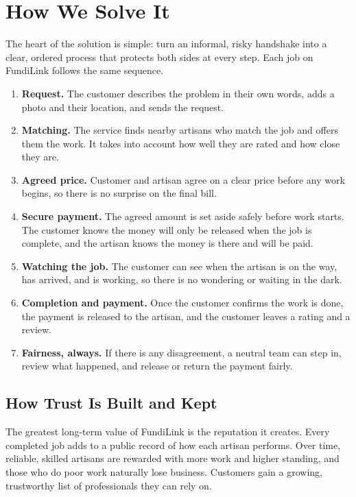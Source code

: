 \documentclass[11pt,a4paper]{article}
\begin{document}
\section{How We Solve It}

The heart of the solution is simple: turn an informal, risky handshake into a clear, ordered
process that protects both sides at every step. Each job on FundiLink follows the same
sequence.

\begin{enumerate}[leftmargin=1.5em]
    \item \textbf{Request.} The customer describes the problem in their own words, adds a
          photo and their location, and sends the request.
    \item \textbf{Matching.} The service finds nearby artisans who match the job and offers
          them the work. It takes into account how well they are rated and how close they are.
    \item \textbf{Agreed price.} Customer and artisan agree on a clear price before any work
          begins, so there is no surprise on the final bill.
    \item \textbf{Secure payment.} The agreed amount is set aside safely before work starts.
          The customer knows the money will only be released when the job is complete, and
          the artisan knows the money is there and will be paid.
    \item \textbf{Watching the job.} The customer can see when the artisan is on the way,
          has arrived, and is working, so there is no wondering or waiting in the dark.
    \item \textbf{Completion and payment.} Once the customer confirms the work is done, the
          payment is released to the artisan, and the customer leaves a rating and a review.
    \item \textbf{Fairness, always.} If there is any disagreement, a neutral team can step in,
          review what happened, and release or return the payment fairly.
\end{enumerate}

\subsection{How Trust Is Built and Kept}

The greatest long-term value of FundiLink is the reputation it creates. Every completed job
adds to a public record of how each artisan performs. Over time, reliable, skilled artisans
are rewarded with more work and higher standing, and those who do poor work naturally lose
business. Customers gain a growing, trustworthy list of professionals they can rely on.
\end{document}
